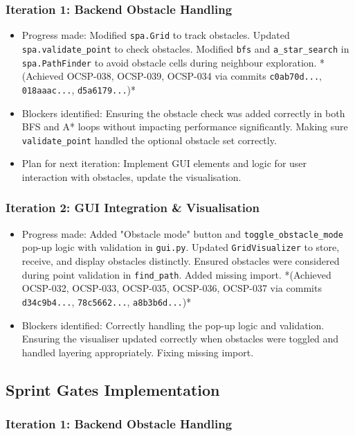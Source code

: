 \subsubsection{Iteration 1: Backend Obstacle Handling}
\begin{itemize}
	\item Progress made: Modified \verb|spa.Grid| to track obstacles. Updated \verb|spa.validate_point| to check obstacles. Modified \verb|bfs| and \verb|a_star_search| in \verb|spa.PathFinder| to avoid obstacle cells during neighbour exploration. *(Achieved OCSP-038, OCSP-039, OCSP-034 via commits \verb|c0ab70d...|, \verb|018aaac...|, \verb|d5a6179...|)*
	\item Blockers identified: Ensuring the obstacle check was added correctly in both BFS and A* loops without impacting performance significantly. Making sure \verb|validate_point| handled the optional obstacle set correctly.
	\item Plan for next iteration: Implement GUI elements and logic for user interaction with obstacles, update the visualisation.
\end{itemize}

\subsubsection{Iteration 2: GUI Integration \& Visualisation}
\begin{itemize}
	\item Progress made: Added "Obstacle mode" button and \verb|toggle_obstacle_mode| pop-up logic with validation in \verb|gui.py|. Updated \verb|GridVisualizer| to store, receive, and display obstacles distinctly. Ensured obstacles were considered during point validation in \verb|find_path|. Added missing import. *(Achieved OCSP-032, OCSP-033, OCSP-035, OCSP-036, OCSP-037 via commits \verb|d34c9b4...|, \verb|78c5662...|, \verb|a8b3b6d...|)*
	\item Blockers identified: Correctly handling the pop-up logic and validation. Ensuring the visualiser updated correctly when obstacles were toggled and handled layering appropriately. Fixing missing import.
\end{itemize}

\subsection{Sprint Gates Implementation}

\subsubsection{Iteration 1: Backend Obstacle Handling}

